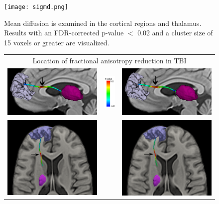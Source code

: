 \begin{figure}
\begin{center}
\texttt{[image: sigmd.png]}
\caption{Mean diffusion is examined in the cortical regions and thalamus. Results with an FDR-corrected p-value $<$ 0.02 and a cluster size of 15 voxels or greater are visualized.}
\label{fig:volstats}
\end{center}
\end{figure}

\begin{figure}
\begin{center}
\begin{tabular}{ccc}
\multicolumn{3}{c}{Location of fractional anisotropy reduction in TBI} \\
\includegraphics[width=0.42\linewidth]{figures/subject_tstat.png} &
\includegraphics[width=0.08\linewidth]{figures/tcolorbar.png}&
\includegraphics[width=0.42\linewidth]{figures/template_tstat.png} \\
\includegraphics[width=0.42\linewidth]{figures/tbi_subject_axial.png} & &
\includegraphics[width=0.42\linewidth]{figures/tbi_template_axial.png} \\

\end{tabular}
\end{center}
\end{figure}

